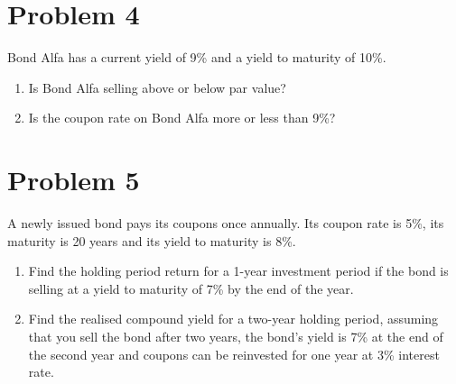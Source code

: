 \documentclass[12]{article}
\begin{document}
\color{black}
\section*{Problem 4}
Bond Alfa has a current yield of 9\% and a yield to maturity of 10\%. 
\begin{enumerate}
    \item[a)] Is Bond Alfa selling above or below par value?
    \item[b)] Is the coupon rate on Bond Alfa more or less than 9\%?
\end{enumerate}




\color{black}
\section*{Problem 5}
A newly issued bond pays its coupons once annually. Its coupon rate is 5\%, its maturity is 20 years and its yield to maturity is 8\%.
\begin{enumerate}
    \item[a)] Find the holding period return for a 1-year investment period if the bond is selling at a yield to maturity of 7\% by the end of the year.
    \item[b)] Find the realised compound yield for a two-year holding period, assuming that you sell the bond after two years, the bond's yield is 7\% at the end of the second year and coupons can be reinvested for one year at 3\% interest rate.
\end{enumerate}




\color{black}
\end{document}
